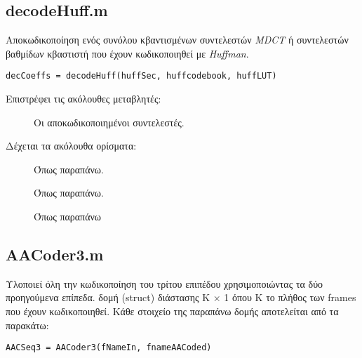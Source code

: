 \subsection*{decodeHuff.m}
Αποκωδικοποίηση ενός συνόλου κβαντισμένων συντελεστών \emph{MDCT} ή
συντελεστών βαθμίδων κβαστιστή που έχουν κωδικοποιηθεί με \emph{Huﬀman}.
\begin{center}
  \verb|decCoeffs = decodeHuff(huffSec, huffcodebook, huffLUT)|
\end{center}

\noindent Επιστρέφει τις ακόλουθες μεταβλητές:
\begin{description}
  \item[] Οι αποκωδικοποιημένοι συντελεστές.
\end{description}

\noindent Δέχεται τα ακόλουθα ορίσματα:
\begin{description}
  \item[] Όπως παραπάνω.
  \item[] Όπως παραπάνω.
  \item[] Όπως παραπάνω
\end{description}

\subsection*{AACoder3.m}
Υλοποιεί όλη την κωδικοποίηση του τρίτου επιπέδου χρησιμοποιώντας τα δύο προηγούμενα
επίπεδα.
 δομή (struct) διάστασης K × 1 όπου K το πλήθος των frames που έχουν κωδικοποιηθεί. Κάθε
στοιχείο της παραπάνω δομής αποτελείται από τα παρακάτω:
\begin{center}
  \verb|AACSeq3 = AACoder3(fNameIn, fnameAACoded)|
\end{center}

